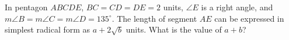 In pentagon $ABCDE$, $BC=CD=DE=2$ units, $\angle E$ is a right angle, and $m\angle B=m\angle C=m\angle D=135^\circ$. The length of segment $AE$ can be expressed in simplest radical form as $a+2\sqrt b$ units. What is the value of $a+b$?
